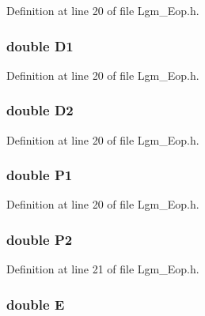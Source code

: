 Definition at line 20 of file Lgm\_\-Eop.h.\hypertarget{struct_lgm___nga_eopp_98190861f5c5ac1bb59aaf713ede0023}{
\subsubsection[{D1}]{\setlength{\rightskip}{0pt plus 5cm}double {\bf D1}}}
\label{struct_lgm___nga_eopp_98190861f5c5ac1bb59aaf713ede0023}




Definition at line 20 of file Lgm\_\-Eop.h.\hypertarget{struct_lgm___nga_eopp_09d4b3eb759f7ace4ea7b734751de4d5}{
\subsubsection[{D2}]{\setlength{\rightskip}{0pt plus 5cm}double {\bf D2}}}
\label{struct_lgm___nga_eopp_09d4b3eb759f7ace4ea7b734751de4d5}




Definition at line 20 of file Lgm\_\-Eop.h.\hypertarget{struct_lgm___nga_eopp_4c5be5bc2ea5a16617dd95b7d38d288d}{
\subsubsection[{P1}]{\setlength{\rightskip}{0pt plus 5cm}double {\bf P1}}}
\label{struct_lgm___nga_eopp_4c5be5bc2ea5a16617dd95b7d38d288d}




Definition at line 20 of file Lgm\_\-Eop.h.\hypertarget{struct_lgm___nga_eopp_852164d2426de96766457e8d648911d4}{
\subsubsection[{P2}]{\setlength{\rightskip}{0pt plus 5cm}double {\bf P2}}}
\label{struct_lgm___nga_eopp_852164d2426de96766457e8d648911d4}




Definition at line 21 of file Lgm\_\-Eop.h.\hypertarget{struct_lgm___nga_eopp_1eb62b8cb1f5e5f571d51179718e7d4c}{
\subsubsection[{E}]{\setlength{\rightskip}{0pt plus 5cm}double {\bf E}}}
\label{struct_lgm___nga_eopp_1eb62b8cb1f5e5f571d51179718e7d4c}




